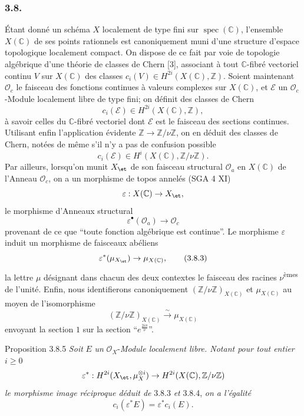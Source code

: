 \subsubsection*{3.8.}
Étant donné un schéma $X$ localement de type fini sur $\operatorname{spec}(\mathbb{C})$, l'ensemble $X(\mathbb{C})$ de ses points rationnels est canoniquement muni d'une structure d'espace topologique localement compact. On dispose de ce fait par voie de topologie algébrique d'une théorie de classes de Chern [3], associant à tout $\mathbb{C}$-fibré vectoriel continu $V$ sur $X(\mathbb{C})$ des classes $c_i(V)\in H^{2i}(X(\mathbb{C}),\mathbb{Z})$. Soient maintenant $\mathcal{O}_c$ le faisceau des fonctions continues à valeurs complexes sur $X(\mathbb{C})$, et $\mathcal{E}$ un $\mathcal{O}_c$-Module localement libre de type fini; on définit des classes de Chern
\[
c_i(\mathcal{E})\in H^{2i}(X(\mathbb{C}),\mathbb{Z}),
\]
à savoir celles du $\mathbb{C}$-fibré vectoriel dont $\mathcal{E}$ est le faisceau des sections continues. Utilisant enfin l'application évidente $\mathbb{Z}\to\mathbb{Z}/\nu\mathbb{Z}$, on en déduit des classes de Chern, notées de même s'il n'y a pas de confusion possible
\[
c_i(\mathcal{E})\in H^i(X(\mathbb{C}),\mathbb{Z}/\nu\mathbb{Z}).
\tag{3.8.1}
\]
Par
ailleurs, lorsqu'on munit $X_{\et}$ de son faisceau structural $\mathcal{O}_a$ en $X(\mathbb{C})$ de l'Anneau $\mathcal{O}_c$, on a un morphisme de topos annelés (SGA 4 XI)
\[
\varepsilon:X(\mathbb{C})\to X_{\et},
\]
le morphisme d'Anneaux structural
\[
\varepsilon^{\bullet}(\mathcal{O}_a)\to\mathcal{O}_c
\tag{3.8.2}
\]
provenant de ce que ``toute fonction algébrique est continue''. Le morphisme $\varepsilon$ induit un morphisme de faisceaux abéliens
\[
\varepsilon^*(\mu_{X_{\et}})\to \mu_{X(\mathbb{C})},
\tag{3.8.3}
\]
la lettre $\mu$ désignant dans chacun des deux contextes le faisceau des racines $\nu$\textsuperscript{èmes} de l'unité. Enfin, nous identifierons canoniquement $(\mathbb{Z}/\nu\mathbb{Z})_{X(\mathbb{C})}$ et $\mu_{X(\mathbb{C})}$ au moyen de l'isomorphisme
\[
(\mathbb{Z}/\nu\mathbb{Z})_{X(\mathbb{C})}
 \xrightarrow{\sim}\mu_{X(\mathbb{C})}
\tag{3.8.4}
\]
envoyant la section $1$ sur la section ``$e^{\frac{2i\pi}{\nu}}$''.

\begin{statement}{Proposition 3.8.5}
\emph{Soit} $E$ \emph{un} $\mathcal{O}_X$-\emph{Module localement libre. Notant pour tout entier} $i\ge0$
\[
\varepsilon^*:H^{2i}(X_{\et},\mu_X^{\otimes i})
\to H^{2i}(X(\mathbb{C}),\mathbb{Z}/\nu\mathbb{Z})
\]
\emph{le morphisme image réciproque déduit de} 3.8.3 \emph{et} 3.8.4, \emph{on a l'égalité}
\[
c_i(\varepsilon^*E)=\varepsilon^*c_i(E).
\]
\end{statement}

